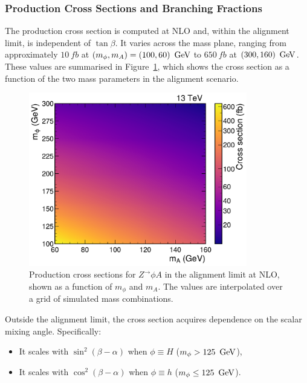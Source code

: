 \subsubsection{Production Cross Sections and Branching Fractions}

The production cross section is computed at NLO and, within the alignment limit, is independent of $\tan\beta$. It varies across the mass plane, ranging from approximately $10~\unit{fb}$ at $(m_\phi, m_A) = (100, 60)~\,\text{Ge\hspace{-.08em}V}$ to $650~\unit{fb}$ at $(300, 160)~\,\text{Ge\hspace{-.08em}V}$. These values are summarised in Figure~\ref{Figure:Chapter6_ProductionXS}, which shows the cross section as a function of the two mass parameters in the alignment scenario.

\begin{figure}[h]
  \centering
  \includegraphics[width=0.85\textwidth]{Figures/Chapter6/Production_XS.pdf}
    \caption[Production cross sections for $Z^* \to \phi A$ in the alignment limit.]{Production cross sections for $Z^ \to \phi A$ in the alignment limit at NLO, shown as a function of $m_\phi$ and $m_A$. The values are interpolated over a grid of simulated mass combinations.}
  \label{Figure:Chapter6_ProductionXS}
\end{figure}

Outside the alignment limit, the cross section acquires dependence on the scalar mixing angle. Specifically:
\begin{itemize}
    \item It scales with $\sin^2(\beta - \alpha)$ when $\phi \equiv H$ ($m_\phi > 125~\,\text{Ge\hspace{-.08em}V}$),
    \item It scales with $\cos^2(\beta - \alpha)$ when $\phi \equiv h$ ($m_\phi \leq 125~\,\text{Ge\hspace{-.08em}V}$).
\end{itemize}

